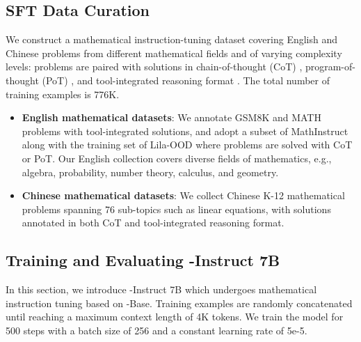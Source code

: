 \subsection{SFT Data Curation}

We construct a mathematical instruction-tuning dataset covering English and Chinese problems from different mathematical fields and of varying complexity levels:
problems are paired with solutions in chain-of-thought (CoT) \citep{cot}, program-of-thought (PoT) \citep{pot,pal}, and tool-integrated reasoning format \citep{tora}.
The total number of training examples is 776K.
\begin{itemize}[topsep=0pt]
    \item \textbf{English mathematical datasets}:
    We annotate GSM8K and MATH problems with tool-integrated solutions, and adopt a subset of MathInstruct \citep{MathInstruct} along with the training set of Lila-OOD \citep{lila} where problems are solved with CoT or PoT.
    Our English collection covers diverse fields of mathematics, e.g., algebra, probability, number theory, calculus, and geometry.
    \item \textbf{Chinese mathematical datasets}:
    We collect Chinese K-12 mathematical problems spanning 76 sub-topics such as linear equations, with solutions annotated in both CoT and tool-integrated reasoning format.
\end{itemize}

\subsection{Training and Evaluating \spmath-Instruct 7B}

In this section, we introduce \spmath-Instruct 7B which undergoes mathematical instruction tuning based on \spmath-Base.
Training examples are randomly concatenated until reaching a maximum context length of 4K tokens.
We train the model for 500 steps with a batch size of 256 and a constant learning rate of 5e-5.

